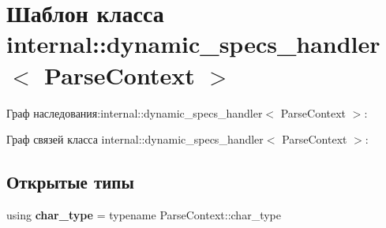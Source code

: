 \hypertarget{classinternal_1_1dynamic__specs__handler}{}\section{Шаблон класса internal\+:\+:dynamic\+\_\+specs\+\_\+handler$<$ Parse\+Context $>$}
\label{classinternal_1_1dynamic__specs__handler}


Граф наследования\+:internal\+:\+:dynamic\+\_\+specs\+\_\+handler$<$ Parse\+Context $>$\+:


Граф связей класса internal\+:\+:dynamic\+\_\+specs\+\_\+handler$<$ Parse\+Context $>$\+:
\subsection*{Открытые типы}
\begin{DoxyCompactItemize}
\item 
\mbox{\label{classinternal_1_1dynamic__specs__handler_aba0f14efb880e4b8ccdf97fdb430467b}} 
using {\bfseries char\+\_\+type} = typename Parse\+Context\+::char\+\_\+type
\end{DoxyCompactItemize}
